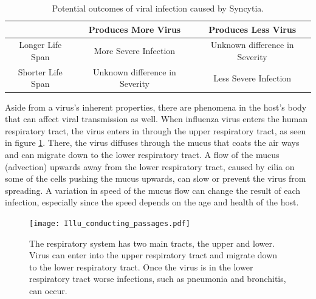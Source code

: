 \documentclass[a4paper]{article}
\begin{document}
\begin{table}[h]
    \centering
    \caption{Potential outcomes of viral infection caused by Syncytia.}
    \begin{tabular}{|c|c|c|}
        \hline
          & Produces More Virus & Produces Less Virus\\
        \hline
        Longer Life Span & More Severe Infection & Unknown difference in Severity\\
        \hline
        Shorter Life Span & Unknown difference in Severity & Less Severe Infection\\
        \hline
    \end{tabular}
    \label{tab:SyncytiaProduction}
\end{table}

Aside from a virus's inherent properties, there are phenomena in the host's body that can affect viral transmission as well. When influenza virus enters the human respiratory tract, the virus enters in through the upper respiratory tract, as seen in figure \ref{fig:RespiratoryTract}. There, the virus diffuses through the mucus that coats the air ways and can migrate down to the lower respiratory tract. A flow of the mucus (advection) upwards away from the lower respiratory tract, caused by cilia on some of the cells pushing the mucus upwards, can slow or prevent the virus from spreading. A variation in speed of the mucus flow can change the result of each infection, especially since the speed depends on the age and health of the host.

\begin{figure}[H]
    \centering
    \texttt{[image: Illu\_conducting\_passages.pdf]}
    \caption{The respiratory system has two main tracts, the upper and lower. Virus can enter into the upper respiratory tract and migrate down to the lower respiratory tract. Once the virus is in the lower respiratory tract worse infections, such as pneumonia and bronchitis, can occur.}
    \label{fig:RespiratoryTract}
\end{figure}
\end{document}
